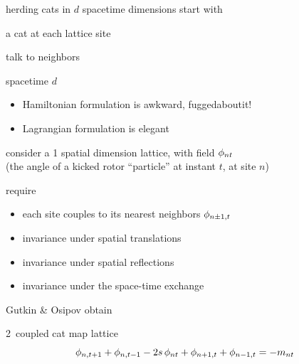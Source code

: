 \begin{frame}{herding cats in $d$ spacetime dimensions}
start with
\begin{block}{a cat at each lattice site}
\bigskip

talk to neighbors
\medskip

spacetime $d$\dmn\
~~~~~~~ {\color{blue}\Large \catlatt}
\end{block}

\vfill

\begin{itemize}
  \item {\scriptsize Hamiltonian formulation is awkward, fuggedaboutit!}
  \item Lagrangian formulation is elegant
\end{itemize}
\end{frame}

\begin{frame}{\catlatt}
consider
a 1 spatial dimension lattice, with field
$\phi_{nt}$ \\
(the angle of a kicked
rotor ``particle'' at instant $t$, at site $n$)
\begin{block}{require}
\begin{itemize}
\item  each site couples to
its nearest neighbors $\phi_{n\pm1,t}$
\item  invariance under
spatial translations
\item  invariance under spatial reflections
\item  invariance under the space-time exchange
\end{itemize}
\end{block}

\bigskip

Gutkin \& Osipov obtain
\begin{block}{2\dmn\ coupled cat map lattice}
\[
\phi_{n,t+1} + \phi_{n,t-1} - 2s \, \phi_{n t} + \phi_{n+1,t} + \phi_{n-1, t}
     =-{m_{n t}}
\] %
\end{block}
\end{frame}


